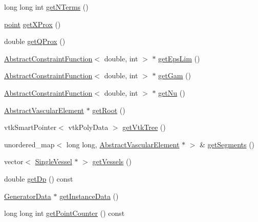 \begin{DoxyCompactItemize}
\item 
long long int \hyperlink{class_abstract_object_c_c_o_tree_a0c8fc5cdc84a9f5097dda24443c2462f}{get\+N\+Terms} ()
\item 
\hyperlink{structpoint}{point} \hyperlink{class_abstract_object_c_c_o_tree_a81862bcbe6e223d216079b1522ad0db1}{get\+X\+Prox} ()
\item 
double \hyperlink{class_abstract_object_c_c_o_tree_a81336407d6138888b916f12d75e7ae74}{get\+Q\+Prox} ()
\item 
\hyperlink{class_abstract_constraint_function}{Abstract\+Constraint\+Function}$<$ double, int $>$ $\ast$ \hyperlink{class_abstract_object_c_c_o_tree_a08cb14298e5ab481a9540b5487db54b0}{get\+Eps\+Lim} ()
\item 
\hyperlink{class_abstract_constraint_function}{Abstract\+Constraint\+Function}$<$ double, int $>$ $\ast$ \hyperlink{class_abstract_object_c_c_o_tree_ad97518a157cf02e69ef931044251d349}{get\+Gam} ()
\item 
\hyperlink{class_abstract_constraint_function}{Abstract\+Constraint\+Function}$<$ double, int $>$ $\ast$ \hyperlink{class_abstract_object_c_c_o_tree_aa1ee6820dc34e0aa9f5797c86ed41ee4}{get\+Nu} ()
\item 
\hyperlink{class_abstract_vascular_element}{Abstract\+Vascular\+Element} $\ast$ \hyperlink{class_abstract_object_c_c_o_tree_a98a758f4b6fd1528e8105f46867e60c3}{get\+Root} ()
\item 
vtk\+Smart\+Pointer$<$ vtk\+Poly\+Data $>$ \hyperlink{class_abstract_object_c_c_o_tree_afb5faccc7f05d32bcfd6f97937b7fb6c}{get\+Vtk\+Tree} ()
\item 
unordered\+\_\+map$<$ long long, \hyperlink{class_abstract_vascular_element}{Abstract\+Vascular\+Element} $\ast$ $>$ \& \hyperlink{class_abstract_object_c_c_o_tree_a6c683280e655c0628a53146c84fdbeed}{get\+Segments} ()
\item 
vector$<$ \hyperlink{class_single_vessel}{Single\+Vessel} $\ast$ $>$ \hyperlink{class_abstract_object_c_c_o_tree_acbe0b850c270bc60967111b73d1b927b}{get\+Vessels} ()
\item 
double \hyperlink{class_abstract_object_c_c_o_tree_a71e56a3920535ed6fddffdbffe53773d}{get\+Dp} () const 
\item 
\hyperlink{class_generator_data}{Generator\+Data} $\ast$ \hyperlink{class_abstract_object_c_c_o_tree_a2088df2b807ea7cff5c03b28025e4891}{get\+Instance\+Data} ()
\item 
long long int \hyperlink{class_abstract_object_c_c_o_tree_a56872932997c02693841597baabfd541}{get\+Point\+Counter} () const 

\end{DoxyCompactItemize}
